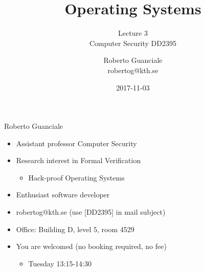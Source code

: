 \documentclass{beamer}
\title{Operating Systems}
\subtitle{Lecture 3 \\ Computer Security DD2395}
\author[R. Guanciale]{
  Roberto Guanciale\\
  robertog@kth.se
}
\date{2017-11-03}
\begin{document}
\maketitle

\begin{frame}{Roberto Guanciale}
  \begin{itemize}
    \item Assistant professor \alert{Computer Security}
    \item Research interest in \alert{Formal Verification}
      \begin{itemize}
        \item Hack-proof Operating Systems
      \end{itemize}
    \item Enthusiast software developer
    \item robertog@kth.se (use [DD2395] in mail subject)
    \item Office: Building D, level 5, room 4529
    \item You are welcomed (no booking required, no fee)
    \begin{itemize}
      \item Tuesday 13:15-14:30
    \end{itemize}
  \end{itemize}
\end{frame}


\end{document}
